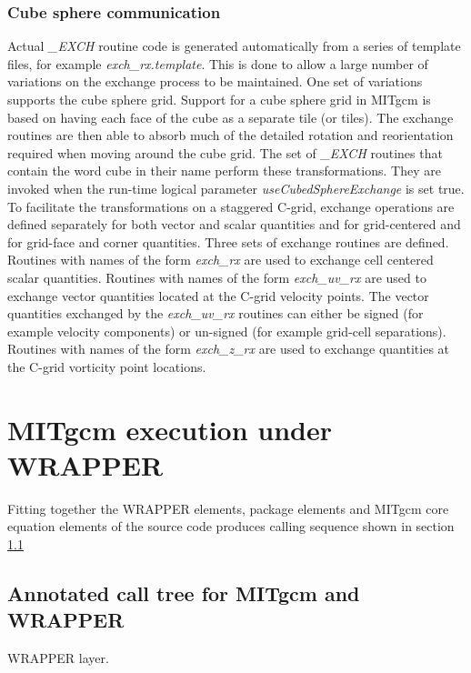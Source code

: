 \subsubsection{Cube sphere communication}
\label{sec:cube_sphere_communication}
Actual {\em \_EXCH} routine code is generated automatically from 
a series of template files, for example {\em exch\_rx.template}.
This is done to allow a large number of variations on the exchange 
process to be maintained. One set of variations supports the
cube sphere grid. Support for a cube sphere grid in MITgcm is based
on having each face of the cube as a separate tile (or tiles).
The exchange routines are then able to absorb much of the
detailed rotation and reorientation required when moving around the
cube grid. The set of {\em \_EXCH} routines that contain the
word cube in their name perform these transformations.
They are invoked when the run-time logical parameter
{\em useCubedSphereExchange} is set true. To facilitate the
transformations on a staggered C-grid, exchange operations are defined 
separately for both vector and scalar quantities and for
grid-centered and for grid-face and corner quantities.
Three sets of exchange routines are defined. Routines
with names of the form {\em exch\_rx} are used to exchange
cell centered scalar quantities. Routines with names of the form
{\em exch\_uv\_rx} are used to exchange vector quantities located at
the C-grid velocity points. The vector quantities exchanged by the 
{\em exch\_uv\_rx} routines can either be signed (for example velocity 
components) or un-signed (for example grid-cell separations).
Routines with names of the form {\em exch\_z\_rx} are used to exchange 
quantities at the C-grid vorticity point locations.




\section{MITgcm execution under WRAPPER}

Fitting together the WRAPPER elements, package elements and
MITgcm core equation elements of the source code produces calling
sequence shown in section \ref{sec:calling_sequence}

\subsection{Annotated call tree for MITgcm and WRAPPER}
\label{sec:calling_sequence}

WRAPPER layer.

